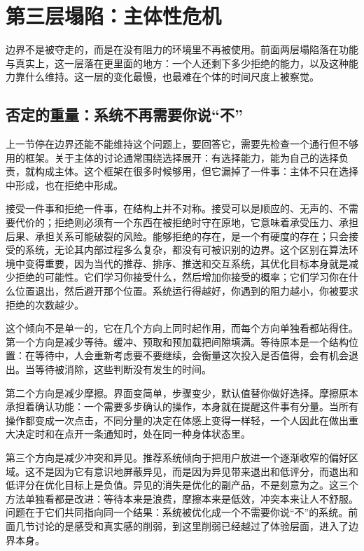 \section{第三层塌陷：主体性危机}

边界不是被夺走的，而是在没有阻力的环境里不再被使用。前面两层塌陷落在功能与真实上，这一层落在更里面的地方：一个人还剩下多少拒绝的能力，以及这种能力靠什么维持。这一层的变化最慢，也最难在个体的时间尺度上被察觉。

\subsection{否定的重量：系统不再需要你说“不”}


上一节停在边界还能不能维持这个问题上，要回答它，需要先检查一个通行但不够用的框架。关于主体的讨论通常围绕选择展开：有选择能力，能为自己的选择负责，就构成主体。这个框架在很多时候够用，但它漏掉了一件事：主体不只在选择中形成，也在拒绝中形成。

接受一件事和拒绝一件事，在结构上并不对称。接受可以是顺应的、无声的、不需要代价的；拒绝则必须有一个东西在被拒绝时守在原地，它意味着承受压力、承担后果、承担关系可能破裂的风险。能够拒绝的存在，是一个有硬度的存在；只会接受的系统，无论其内部过程多么复杂，都没有可被识别的边界。这个区别在算法环境中变得重要，因为当代的推荐、排序、推送和交互系统，其优化目标本身就是减少拒绝的可能性。它们学习你接受什么，然后增加你接受的概率；它们学习你在什么位置退出，然后避开那个位置。系统运行得越好，你遇到的阻力越小，你被要求拒绝的次数越少。


这个倾向不是单一的，它在几个方向上同时起作用，而每个方向单独看都站得住。第一个方向是减少等待。缓冲、预取和预加载把间隙填满。等待原本是一个结构位置：在等待中，人会重新考虑要不要继续，会衡量这次投入是否值得，会有机会退出。当等待被消除，这些判断没有发生的时间。

第二个方向是减少摩擦。界面变简单，步骤变少，默认值替你做好选择。摩擦原本承担着确认功能：一个需要多步确认的操作，本身就在提醒这件事有分量。当所有操作都变成一次点击，不同分量的决定在体感上变得一样轻，一个人因此在做出重大决定时和在点开一条通知时，处在同一种身体状态里。

第三个方向是减少冲突和异见。推荐系统倾向于把用户放进一个逐渐收窄的偏好区域。这不是因为它有意识地屏蔽异见，而是因为异见带来退出和低评分，而退出和低评分在优化目标上是负值。异见的消失是优化的副产品，不是刻意为之。这三个方法单独看都是改进：等待本来是浪费，摩擦本来是低效，冲突本来让人不舒服。问题在于它们共同指向同一个结果：系统被优化成一个不需要你说“不”的系统。前面几节讨论的是感受和真实感的削弱，到这里削弱已经越过了体验层面，进入了边界本身。

